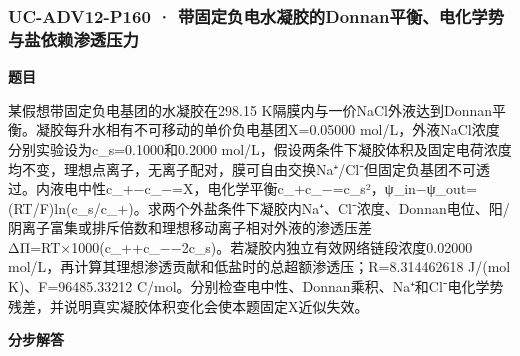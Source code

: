\documentclass[UTF8,11pt,a4paper]{ctexart}
\begin{document}
\subsubsection*{UC-ADV12-P160 · 带固定负电水凝胶的Donnan平衡、电化学势与盐依赖渗透压力}
\noindent\textbf{题目}\par
某假想带固定负电基团的水凝胶在298.15 K隔膜内与一价NaCl外液达到Donnan平衡。凝胶每升水相有不可移动的单价负电基团X=0.05000 mol/L，外液NaCl浓度分别实验设为c\_s=0.1000和0.2000 mol/L，假设两条件下凝胶体积及固定电荷浓度均不变，理想点离子，无离子配对，膜可自由交换Na⁺/Cl⁻但固定负基团不可透过。内液电中性c\_+−c\_−=X，电化学平衡c\_+c\_−=c\_s²，ψ\_in−ψ\_out=(RT/F)ln(c\_s/c\_+)。求两个外盐条件下凝胶内Na⁺、Cl⁻浓度、Donnan电位、阳/阴离子富集或排斥倍数和理想移动离子相对外液的渗透压差ΔΠ=RT×1000(c\_++c\_−−2c\_s)。若凝胶内独立有效网络链段浓度0.02000 mol/L，再计算其理想渗透贡献和低盐时的总超额渗透压；R=8.314462618 J/(mol K)、F=96485.33212 C/mol。分别检查电中性、Donnan乘积、Na⁺和Cl⁻电化学势残差，并说明真实凝胶体积变化会使本题固定X近似失效。\par
\medskip\noindent\textbf{分步解答}
\end{document}
